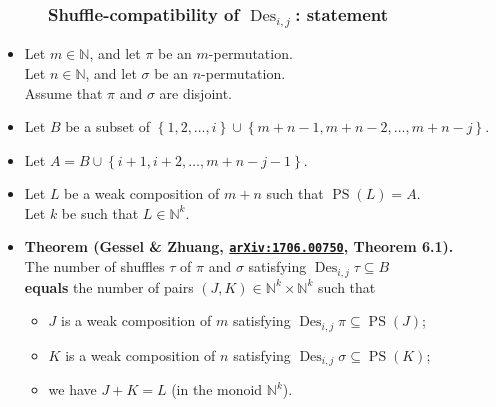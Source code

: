 \documentclass{beamer}
\newcommand{\red}{\color{red}}
\newcommand{\NN}{{\mathbb N}}
\newcommand{\Des}{\operatorname{Des}}
\newcommand{\PS}{\operatorname{PS}}
\newcommand\arxiv[1]{\href{http://www.arxiv.org/abs/#1}{\texttt{arXiv:#1}}}
\newcommand{\fti}[1]{\frametitle{\ \ \ \ \ #1}}
\newcommand{\set}[1]{\left\{ #1 \right\}}
\newcommand{\tup}[1]{\left( #1 \right)}
\theoremstyle{plain}
\begin{document}
\begin{frame}
\fti{Shuffle-compatibility of $\Des_{i,j}$: statement}

\begin{itemize}

\item Let $m \in \NN$, and let $\pi$ be an $m$-permutation. \\
      Let $n \in \NN$, and let $\sigma$ be an $n$-permutation. \\
      Assume that $\pi$ and $\sigma$ are disjoint.

\item Let $B$ be a subset of $\set{1, 2, \ldots, i} \cup \set{m+n-1, m+n-2, \ldots, m+n-j}$. \\

\item Let $A = B \cup \set{i+1, i+2, \ldots, m+n-j-1}$.

\item Let $L$ be a weak composition of $m+n$ such that
      $\PS\tup{L} = A$.
      \\ Let $k$ be such that $L \in \NN^k$.

\item \textbf{Theorem (Gessel \& Zhuang, {\red \arxiv{1706.00750}}, Theorem 6.1).} \\
      The number of shuffles $\tau$ of $\pi$ and $\sigma$ satisfying
      $\Des_{i, j} \tau \subseteq B$ \\
      \textbf{equals} the number of pairs $\tup{J, K} \in \NN^k \times \NN^k$ such that
      \begin{itemize}
      \item $J$ is a weak composition of $m$ satisfying $\Des_{i, j} \pi \subseteq \PS \tup{J}$;
      \item $K$ is a weak composition of $n$ satisfying $\Des_{i, j} \sigma \subseteq \PS \tup{K}$;
      \item we have $J + K = L$ (in the monoid $\NN^k$).
      \end{itemize}

\end{itemize}

\vspace{10cm}

\end{frame}
\end{document}
